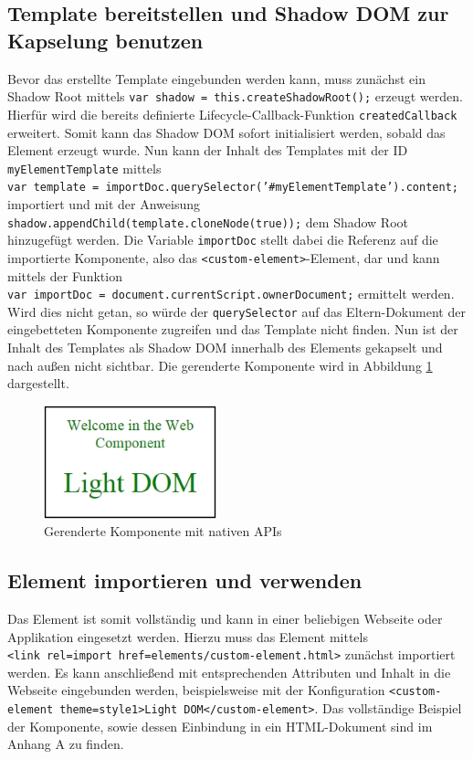 \subsection{Template bereitstellen und Shadow DOM zur Kapselung benutzen}\label{template-bereitstellen-und-shadow-dom-zur-kapselung-benutzen}

Bevor das erstellte Template eingebunden werden kann, muss zunächst ein Shadow Root mittels \texttt{var\ shadow\ =\ this.createShadowRoot();} erzeugt werden. Hierfür wird die bereits definierte Lifecycle-Callback-Funktion \texttt{createdCallback} erweitert. Somit kann das Shadow \ac{DOM} sofort initialisiert werden, sobald das Element erzeugt wurde. Nun kann der Inhalt des Templates mit der ID \texttt{myElementTemplate} mittels \texttt{var\ template\ =\ importDoc.querySelector('\#myElementTemplate').content;} importiert und mit der Anweisung \texttt{shadow.appendChild(template.cloneNode(true));} dem Shadow Root hinzugefügt werden. Die Variable \texttt{importDoc} stellt dabei die Referenz auf die importierte Komponente, also das \texttt{\textless{}custom-element\textgreater{}}-Element, dar und kann mittels der Funktion \texttt{var\ importDoc\ =\ document.currentScript.ownerDocument;} ermittelt werden. Wird dies nicht getan, so würde der \texttt{querySelector} auf das Eltern-Dokument der eingebetteten Komponente zugreifen und das Template nicht finden. Nun ist der Inhalt des Templates als Shadow \ac{DOM} innerhalb des Elements gekapselt und nach außen nicht sichtbar. Die gerenderte Komponente wird in Abbildung \ref{fig:gwkmnapis} dargestellt.

\begin{figure}[htbp]
 \centering
 \includegraphics[width=5cm,keepaspectratio]{kapitel2/bilder/7-beispiel}
 \caption{Gerenderte Komponente mit nativen APIs}
 \label{fig:gwkmnapis}
\end{figure}


\subsection{Element importieren und verwenden}\label{element-importieren-und-verwenden}

Das Element ist somit vollständig und kann in einer beliebigen Webseite oder Applikation eingesetzt werden. Hierzu muss das Element mittels \texttt{\textless{}link\ rel=\dq import\dq\ href=\dq elements/custom-element.html\dq\textgreater{}} zunächst importiert werden. Es kann anschließend mit entsprechenden Attributen und Inhalt in die Webseite eingebunden werden, beispielsweise mit der Konfiguration \texttt{\textless{}custom-element\ theme=\dq style1\dq\textgreater{}Light DOM\textless{}/custom-element\textgreater{}}. Das vollständige Beispiel der Komponente, sowie dessen Einbindung in ein \ac{HTML}-Dokument sind im Anhang A zu finden.
